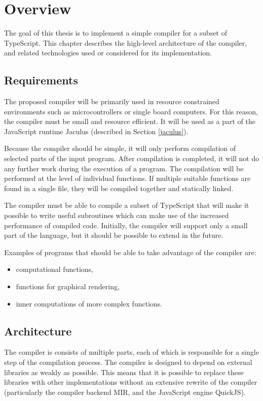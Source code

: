 \chapter{Overview}

The goal of this thesis is to implement a simple compiler for a subset of TypeScript. This chapter describes the high-level architecture of the compiler, and related technologies used or considered for its implementation.


\section{Requirements}

The proposed compiler will be primarily used in resource constrained environments such as microcontrollers or single board computers. For this reason, the compiler must be small and resource efficient. It will be used as a part of the JavaScript runtime Jaculus (described in Section \ref{jaculus}).

Because the compiler should be simple, it will only perform compilation of selected parts of the input program. After compilation is completed, it will not do any further work during the execution of a program. The compilation will be performed at the level of individual functions. If multiple suitable functions are found in a single file, they will be compiled together and statically linked.

The compiler must be able to compile a subset of TypeScript that will make it possible to write useful subroutines which can make use of the increased performance of compiled code. Initially, the compiler will support only a small part of the language, but it should be possible to extend in the future.

Examples of programs that should be able to take advantage of the compiler are:
\begin{itemize}
    \item computational functions,
    \item functions for graphical rendering,
    \item inner computations of more complex functions.
\end{itemize}


\section{Architecture}

The compiler is consists of multiple parts, each of which is responsible for a single step of the compilation process. The compiler is designed to depend on external libraries as weakly as possible. This means that it is possible to replace these libraries with other implementations without an extensive rewrite of the compiler (particularly the compiler backend MIR, and the JavaScript engine QuickJS).

